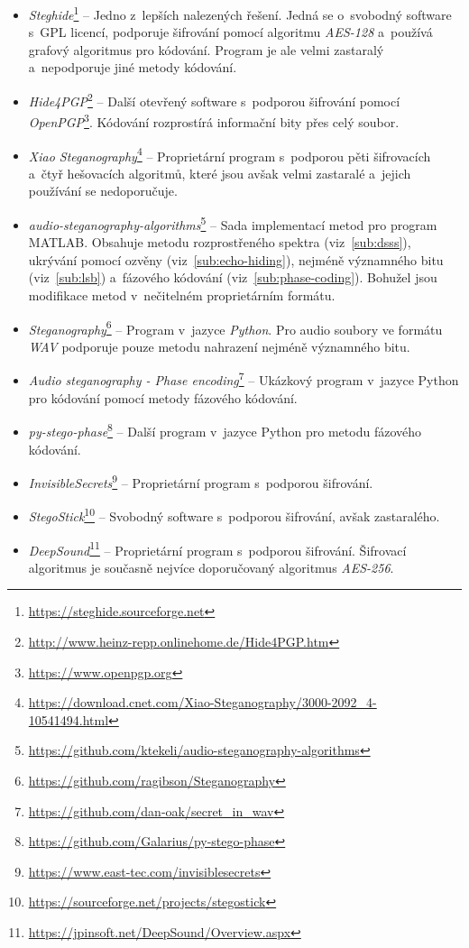 \begin{itemize}
    \item \textit{Steghide}\footnote{\url{https://steghide.sourceforge.net}} --
        Jedno z~lepších nalezených řešení. Jedná se o~svobodný software s~GPL
        licencí, podporuje šifrování pomocí algoritmu \textit{AES-128}
        a~používá grafový algoritmus pro kódování. Program je ale velmi
        zastaralý a~nepodporuje jiné metody kódování.
    \item \textit{Hide4PGP}\footnote{\url{http://www.heinz-repp.onlinehome.de/Hide4PGP.htm}}
        -- Další otevřený software s~podporou šifrování pomocí
        \textit{OpenPGP}\footnote{\url{https://www.openpgp.org}}. Kódování
        rozprostírá informační bity přes celý soubor.
    \item \textit{Xiao Steganography}\footnote{\url{https://download.cnet.com/Xiao-Steganography/3000-2092_4-10541494.html}}
        -- Proprietární program s~podporou pěti šifrovacích a~čtyř hešovacích
        algoritmů, které jsou avšak velmi zastaralé a~jejich používání se
        nedoporučuje.
    \item \textit{audio-steganography-algorithms}\footnote{\url{https://github.com/ktekeli/audio-steganography-algorithms}}
        -- Sada implementací metod pro program MATLAB. Obsahuje metodu
        rozprostřeného spektra (viz~\ref{sub:dsss}), ukrývání pomocí ozvěny
        (viz~\ref{sub:echo-hiding}), nejméně významného bitu
        (viz~\ref{sub:lsb}) a~fázového kódování (viz~\ref{sub:phase-coding}).
        Bohužel jsou modifikace metod v~nečitelném proprietárním formátu.
    \item \textit{Steganography}\footnote{\url{https://github.com/ragibson/Steganography}}
        -- Program v~jazyce \textit{Python}. Pro audio soubory ve formátu
        \textit{WAV} podporuje pouze metodu nahrazení nejméně významného bitu.
    \item \textit{Audio steganography - Phase encoding}\footnote{\url{https://github.com/dan-oak/secret_in_wav}}
        -- Ukázkový program v~jazyce Python pro kódování pomocí metody fázového
        kódování.
    \item \textit{py-stego-phase}\footnote{\url{https://github.com/Galarius/py-stego-phase}}
        -- Další program v~jazyce Python pro metodu fázového kódování.
    \item \textit{InvisibleSecrets}\footnote{\url{https://www.east-tec.com/invisiblesecrets}}
        -- Proprietární program s~podporou šifrování.
    \item \textit{StegoStick}\footnote{\url{https://sourceforge.net/projects/stegostick}}
        -- Svobodný software s~podporou šifrování, avšak zastaralého.
    \item \textit{DeepSound}\footnote{\url{https://jpinsoft.net/DeepSound/Overview.aspx}}
        -- Proprietární program s~podporou šifrování. Šifrovací algoritmus je
        současně nejvíce doporučovaný algoritmus \textit{AES-256}.
\end{itemize}

